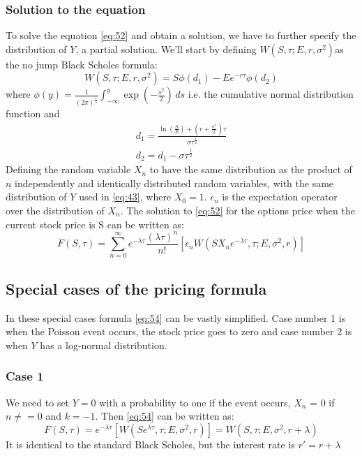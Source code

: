 \documentclass{article}
\begin{document}
\subsubsection{Solution to the equation}
To solve the equation \ref{eq:52} and obtain a solution, we have to further specify the distribution of $Y$, a partial solution. We’ll start by defining $W(S, \tau; E, r, \sigma^2) $as the no jump Black Scholes formula:
\begin{equation}\label{eq:53}
    W(S, \tau; E, r, \sigma^2) = S \phi (d_{1}) - E e^{-r\tau} \phi(d_{2})
\end{equation}
where $\phi(y) = \frac{1}{(2\pi)^{\frac{1}{2}}}\int_{-\infty}^{y}\exp\left({-\frac{s^{2}}{2}}\right)\,ds$ i.e. the cumulative normal distribution function
and 
\begin{gather*}
    d_{1} = \frac{\ln\left(\frac{S}{E}\right)+\left(r+\frac{\sigma^{2}}{2}\right)\tau}{\sigma \tau^{\frac{1}{2}}} \\
    d_{2} = d_{1} - \sigma \tau^{\frac{1}{2}}
\end{gather*}
Defining the random variable $X_{n}$ to have the same distribution as the product of $n$ independently and identically distributed random variables, with the same distribution of $Y$ used in \ref{eq:43}, where $X_{0} = 1$. $\epsilon_{n}$ is the expectation operator over the distribution of $X_{n}$. The solution to \ref{eq:52} for the options price when the current stock price is S can be written as:
\begin{equation} \label{eq:54}
    F(S, \tau) = \sum_{n=0}^{\infty} e^{-\lambda \tau}\frac{(\lambda \tau)^{n}}{n!} \left[\epsilon_{n} W(SX_{n}e^{-\lambda \tau}, \tau; E, \sigma^2, r) \right]
\end{equation}
\subsection{Special cases of the pricing formula}
In these special cases formula \ref{eq:54} can be vastly simplified. Case number 1 is when the Poisson event occurs, the stock price goes to zero and case number 2 is when $Y$ has a log-normal distribution.
\subsubsection{Case 1}
We need to set $Y = 0$ with a probability to one if the event occurs, $X_{n}$ = 0 if $n \neq= 0$ and $k = -1$. Then \ref{eq:54} can be written as:
\begin{equation}
    F(S, \tau) =  e^{-\lambda \tau}\left[W(Se^{\lambda \tau}, \tau; E, \sigma^2, r) \right] = W(S, \tau; E, \sigma^2, r + \lambda)
\end{equation}
It is identical to the standard Black Scholes, but the interest rate is $r' = r + \lambda$
\end{document}
